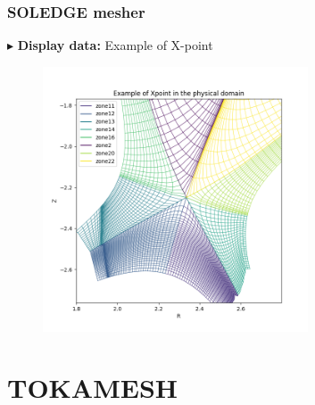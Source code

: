 \documentclass[t,10pt,a3paper]{beamer} %
\newenvironment{changemargin}[2]{%
 \begin{list}{}{%
     \setlength{\topsep}{0pt}%
     \setlength{\leftmargin}{#1}%
     \setlength{\rightmargin}{#2}%
     \setlength{\listparindent}{\parindent}%
     \setlength{\itemindent}{\parindent}%
     \setlength{\parsep}{\parskip}%
   }%
\item[]}{\end{list}}
\begin{document}
\begin{frame} %
\frametitle{\color{vert}\textbf{SOLEDGE mesher}}
\footnotesize	

{\color{vert}$\blacktriangleright$ }
\textbf{Display data:} Example of X-point
\begin{changemargin}{-2cm}{-2cm} 
\begin{center}
\begin{figure}[!h]
	\includegraphics[width=0.7\textwidth]{images/Example_of_Xpoint.png}
\end{figure}	
\end{center}
\end{changemargin}

\end{frame}


\section{TOKAMESH}
\end{document}
